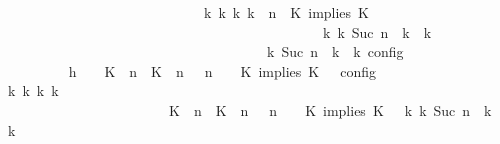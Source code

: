 \begin{isabellebody}
\ \ \ \ \ \ \ \ \ \ \ \ \ \ \ \ \ \ \ \ \ \ \ \ \ \ \ \ {\isasymLongrightarrow}\ {\isasymexists}{\isasymGamma}\isactrlsub k\ {\isasymPsi}\isactrlsub k\ {\isasymPhi}\isactrlsub k\ k{\isachardot}\ {\isacharparenleft}{\isacharparenleft}{\isasymGamma}{\isacharcomma}\ n\ {\isasymturnstile}\ {\isacharparenleft}{\isacharparenleft}K\ implies\ K\ {\isacharhash}\ {\isasymPsi}{\isacharparenright}\ {\isasymtriangleright}\ {\isasymPhi}{\isacharparenright}\isanewline
\ \ \ \ \ \ \ \ \ \ \ \ \ \ \ \ \ \ \ \ \ \ \ \ \ \ \ \ \ \ \ \ \ \ \ \ \ \ \ \ \ \ \ \ \ \ {\isasymhookrightarrow}\isactrlbsup k\isactrlesup \ {\isacharparenleft}{\isasymGamma}\isactrlsub k{\isacharcomma}\ Suc\ n\ {\isasymturnstile}\ {\isasymPsi}\isactrlsub k\ {\isasymtriangleright}\ {\isasymPhi}\isactrlsub k{\isacharparenright}{\isacharparenright}\isanewline
\ \ \ \ \ \ \ \ \ \ \ \ \ \ \ \ \ \ \ \ \ \ \ \ \ \ \ \ \ \ \ \ \ \ {\isasymand}\ {\isasymrho}\ {\isasymin}\ {\isasymlbrakk}\ {\isasymGamma}\isactrlsub k{\isacharcomma}\ Suc\ n\ {\isasymturnstile}\ {\isasymPsi}\isactrlsub k\ {\isasymtriangleright}\ {\isasymPhi}\isactrlsub k\ {\isasymrbrakk}\isactrlsub c\isactrlsub o\isactrlsub n\isactrlsub f\isactrlsub i\isactrlsub g{\isacartoucheclose}\isanewline
\ \ \ \ \ \ \isamarkupfalse%
\ {\isacharminus}\isanewline
\ \ \ \ \ \ \ \ \isamarkupfalse%
\ h{}{\isacharcolon}\ {\isacartoucheopen}{\isasymrho}\ {\isasymin}\ {\isasymlbrakk}\ {\isacharparenleft}{\isacharparenleft}K\ {\isasymUp}\ n{\isacharparenright}\ {\isacharhash}\ {\isacharparenleft}K\ {\isasymUp}\ n{\isacharparenright}\ {\isacharhash}\ {\isasymGamma}{\isacharparenright}{\isacharcomma}\ n\ {\isasymturnstile}\ {\isasymPsi}\ {\isasymtriangleright}\ {\isacharparenleft}{\isacharparenleft}K\ implies\ K\ {\isacharhash}\ {\isasymPhi}{\isacharparenright}\ {\isasymrbrakk}\isactrlsub c\isactrlsub o\isactrlsub n\isactrlsub f\isactrlsub i\isactrlsub g{\isacartoucheclose}\isanewline
\ \ \ \ \ \ \ \ \isamarkupfalse%
\ \isamarkupfalse%
\ {\isacartoucheopen}{\isasymexists}{\isasymGamma}\isactrlsub k\ {\isasymPsi}\isactrlsub k\ {\isasymPhi}\isactrlsub k\ k{\isachardot}\ {\isacharparenleft}\isanewline
\ \ \ \ \ \ \ \ \ \ \ \ \ \ \ \ \ \ \ \ \ \ \ \ {\isacharparenleft}{\isacharparenleft}{\isacharparenleft}K\ {\isasymUp}\ n{\isacharparenright}\ {\isacharhash}\ {\isacharparenleft}K\ {\isasymUp}\ n{\isacharparenright}\ {\isacharhash}\ {\isasymGamma}{\isacharparenright}{\isacharcomma}\ n\ {\isasymturnstile}\ {\isasymPsi}\ {\isasymtriangleright}\ {\isacharparenleft}{\isacharparenleft}K\ implies\ K\ {\isacharhash}\ {\isasymPhi}{\isacharparenright}{\isacharparenright}\ {\isasymhookrightarrow}\isactrlbsup k\isactrlesup \ {\isacharparenleft}{\isasymGamma}\isactrlsub k{\isacharcomma}\ Suc\ n\ {\isasymturnstile}\ {\isasymPsi}\isactrlsub k\ {\isasymtriangleright}\ {\isasymPhi}\isactrlsub k{\isacharparenright}\isanewline

\end{isabellebody}
